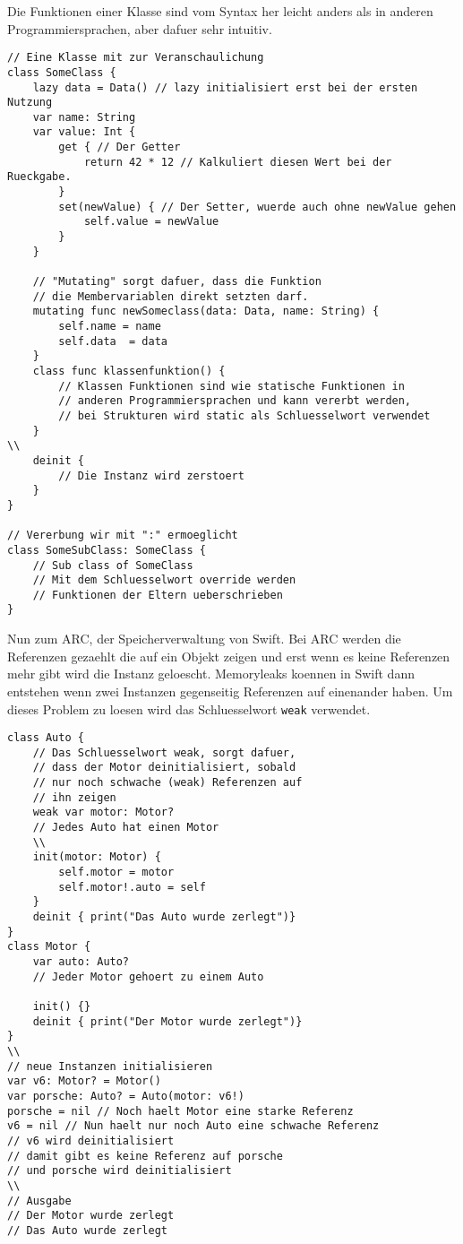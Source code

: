 Die Funktionen einer Klasse sind vom Syntax her leicht anders als in anderen Programmiersprachen, aber dafuer sehr intuitiv. 
\begin{lstlisting}
// Eine Klasse mit zur Veranschaulichung 
class SomeClass {
	lazy data = Data() // lazy initialisiert erst bei der ersten Nutzung
	var name: String
	var value: Int {
		get { // Der Getter
			return 42 * 12 // Kalkuliert diesen Wert bei der Rueckgabe.
		}
		set(newValue) { // Der Setter, wuerde auch ohne newValue gehen
			self.value = newValue
		}	
	} 

	// "Mutating" sorgt dafuer, dass die Funktion 
	// die Membervariablen direkt setzten darf.
	mutating func newSomeclass(data: Data, name: String) {
		self.name = name
		self.data  = data
	}
	class func klassenfunktion() {
		// Klassen Funktionen sind wie statische Funktionen in 
		// anderen Programmiersprachen und kann vererbt werden, 
		// bei Strukturen wird static als Schluesselwort verwendet
	}
\\
	deinit {
		// Die Instanz wird zerstoert
	}
}

// Vererbung wir mit ":" ermoeglicht
class SomeSubClass: SomeClass {
	// Sub class of SomeClass
	// Mit dem Schluesselwort override werden 
	// Funktionen der Eltern ueberschrieben
}
\end{lstlisting}
Nun zum ARC, der Speicherverwaltung von Swift. Bei ARC werden die Referenzen gezaehlt die auf ein Objekt zeigen und erst wenn es keine Referenzen mehr gibt wird die Instanz geloescht. Memoryleaks koennen in Swift dann entstehen wenn zwei Instanzen gegenseitig Referenzen auf einenander haben. Um dieses Problem zu loesen wird das Schluesselwort \lstinline{weak} verwendet.
\begin{lstlisting}
class Auto {
    // Das Schluesselwort weak, sorgt dafuer,
    // dass der Motor deinitialisiert, sobald
    // nur noch schwache (weak) Referenzen auf
    // ihn zeigen
    weak var motor: Motor? 
    // Jedes Auto hat einen Motor
    \\
    init(motor: Motor) {
        self.motor = motor
        self.motor!.auto = self
    }
    deinit { print("Das Auto wurde zerlegt")}
}
class Motor {
    var auto: Auto? 
    // Jeder Motor gehoert zu einem Auto

    init() {}
    deinit { print("Der Motor wurde zerlegt")}
}
\\
// neue Instanzen initialisieren
var v6: Motor? = Motor()
var porsche: Auto? = Auto(motor: v6!)
porsche = nil // Noch haelt Motor eine starke Referenz
v6 = nil // Nun haelt nur noch Auto eine schwache Referenz
// v6 wird deinitialisiert
// damit gibt es keine Referenz auf porsche
// und porsche wird deinitialisiert
\\
// Ausgabe
// Der Motor wurde zerlegt
// Das Auto wurde zerlegt
\end{lstlisting}
